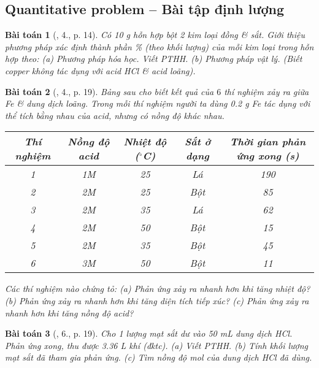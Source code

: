 \documentclass{article}
\newtheorem{baitoan}{Bài toán}
\begin{document}
\subsection{Quantitative problem -- Bài tập định lượng}

\begin{baitoan}[\cite{SGK_Hoa_Hoc_9}, 4., p. 14]
	Có \emph{10 g} hỗn hợp bột 2 kim loại đồng \& sắt. Giới thiệu phương pháp xác định thành phần \% (theo khối lượng) của mỗi kim loại trong hỗn hợp theo: (a) Phương pháp hóa học. Viết PTHH. (b) Phương pháp vật lý. (Biết copper không tác dụng với acid \emph{HCl} \& acid \emph{} loãng).
\end{baitoan}

\begin{baitoan}[\cite{SGK_Hoa_Hoc_9}, 4., p. 19]
	Bảng sau cho biết kết quả của $6$ thí nghiệm xảy ra giữa \emph{Fe} \& dung dịch \emph{} loãng. Trong mỗi thí nghiệm người ta dùng \emph{0.2 g Fe} tác dụng với thể tích bằng nhau của acid, nhưng có nồng độ khác nhau.
	\begin{table}[H]
		\centering
		\begin{tabular}{|c|c|c|c|c|}
			\hline
			Thí nghiệm & Nồng độ acid & Nhiệt độ (${}^\circ$C) & Sắt ở dạng & Thời gian phản ứng xong (s) \\
			\hline
			1 & 1M & 25 & Lá & 190 \\
			\hline
			2 & 2M & 25 & Bột & 85 \\
			\hline
			3 & 2M & 35 & Lá & 62 \\
			\hline
			4 & 2M & 50 & Bột & 15 \\
			\hline
			5 & 2M & 35 & Bột & 45 \\
			\hline
			6 & 3M & 50 & Bột & 11 \\
			\hline
		\end{tabular}
	\end{table}
	\noindent Các thí nghiệm nào chứng tỏ: (a) Phản ứng xảy ra nhanh hơn khi tăng nhiệt độ? (b) Phản ứng xảy ra nhanh hơn khi tăng diện tích tiếp xúc? (c) Phản ứng xảy ra nhanh hơn khi tăng nồng độ acid?
\end{baitoan}

\begin{baitoan}[\cite{SGK_Hoa_Hoc_9}, 6., p. 19]
	Cho 1 lượng mạt sắt dư vào \emph{50 mL} dung dịch \emph{HCl}. Phản ứng xong, thu được \emph{3.36 L} khí (đktc). (a) Viết PTHH. (b) Tính khối lượng mạt sắt đã tham gia phản ứng. (c) Tìm nồng độ mol của dung dịch \emph{HCl} đã dùng.
\end{baitoan}
\end{document}
